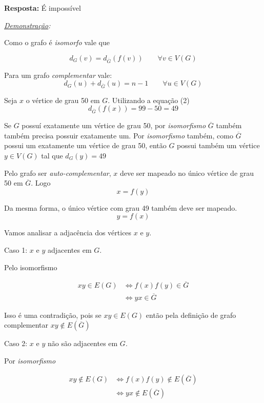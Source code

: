 \documentclass[12pt, a4paper]{article}
\begin{document}
\textbf{Resposta:} É impossível

\smallskip

\textit{\underline{Demonstração}:}

\bigskip

Como o grafo é \textit{isomorfo} vale que

\begin{equation}
    d_{G}(v) = d_{\overline{G}}(f(v)) \qquad \text{$\forall v \in V(G)$}
\end{equation}

Para um grafo \textit{complementar} vale:
\begin{equation}
    d_{G} (u) + d_{\overline{G}}(u) = n-1 \qquad \text{$\forall u \in V(G)$}
\end{equation}


Seja $x$ o vértice de grau 50 em $G$. Utilizando a equação (2)
$$d_{\overline{G}}(f(x)) = 99 - 50 = 49$$

Se $G$ possuí exatamente um vértice de grau 50, por \textit{isomorfismo}
$\overline{G}$ também também precisa possuir exatamente um. Por
\textit{isomorfismo} também, como $\overline{G}$ possui um exatamente um
vértice de grau 50, então $G$ possui também um vértice $y \in V(G)$ tal que
$d_{G}(y)= 49$

Pelo grafo ser \textit{auto-complementar}, $x$ deve ser mapeado no único
vértice de grau 50 em $\overline{G}$. Logo $$x = f(y)$$

Da mesma forma, o único vértice com grau 49 também deve ser mapeado.
$$y = f(x)$$

Vamos analisar a adjacência dos vértices $x$ e $y$.

{\color{ForestGreen} Caso 1:} $x$ e $y$ adjacentes em $G$.

Pelo isomorfismo 

\begin{align*}
    xy \in E(G) & \iff f(x)f(y) \in \overline{G} \\
                & \iff yx \in \overline{G}
\end{align*}

Isso é uma contradição, pois se $xy \in E(G)$ então pela definição de
grafo complementar $xy \notin E(\overline{G})$

{\color{ForestGreen} Caso 2:} $x$ e $y$ não são adjacentes em $G$.

Por \textit{isomorfismo}

\begin{align*}
    xy \notin E(G) & \iff f(x)f(y) \notin E(\overline{G}) \\
                   & \iff yx \notin E(\overline{G})     
\end{align*}
\end{document}
